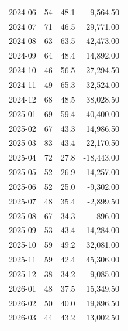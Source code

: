 \documentclass[11pt,a4paper,twoside]{article}
\begin{document}
\begin{center}
\begin{tabular}{>{\color{txtmain}}l rrr}
2024-06 & 54 & 48.1 & \textcolor{wingreen}{9,564.50} \\
2024-07 & 71 & 46.5 & \textcolor{wingreen}{29,771.00} \\
2024-08 & 63 & 63.5 & \textcolor{wingreen}{42,473.00} \\
2024-09 & 64 & 48.4 & \textcolor{wingreen}{14,892.00} \\
2024-10 & 46 & 56.5 & \textcolor{wingreen}{27,294.50} \\
2024-11 & 49 & 65.3 & \textcolor{wingreen}{32,524.00} \\
2024-12 & 68 & 48.5 & \textcolor{wingreen}{38,028.50} \\
2025-01 & 69 & 59.4 & \textcolor{wingreen}{40,400.00} \\
2025-02 & 67 & 43.3 & \textcolor{wingreen}{14,986.50} \\
2025-03 & 83 & 43.4 & \textcolor{wingreen}{22,170.50} \\
2025-04 & 72 & 27.8 & \textcolor{lossred}{-18,443.00} \\
2025-05 & 52 & 26.9 & \textcolor{lossred}{-14,257.00} \\
2025-06 & 52 & 25.0 & \textcolor{lossred}{-9,302.00} \\
2025-07 & 48 & 35.4 & \textcolor{lossred}{-2,899.50} \\
2025-08 & 67 & 34.3 & \textcolor{lossred}{-896.00} \\
2025-09 & 53 & 43.4 & \textcolor{wingreen}{14,284.00} \\
2025-10 & 59 & 49.2 & \textcolor{wingreen}{32,081.00} \\
2025-11 & 59 & 42.4 & \textcolor{wingreen}{45,306.00} \\
2025-12 & 38 & 34.2 & \textcolor{lossred}{-9,085.00} \\
2026-01 & 48 & 37.5 & \textcolor{wingreen}{15,349.50} \\
2026-02 & 50 & 40.0 & \textcolor{wingreen}{19,896.50} \\
2026-03 & 44 & 43.2 & \textcolor{wingreen}{13,002.50} \\
\bottomrule
\end{tabular}
\end{center}
\end{document}
